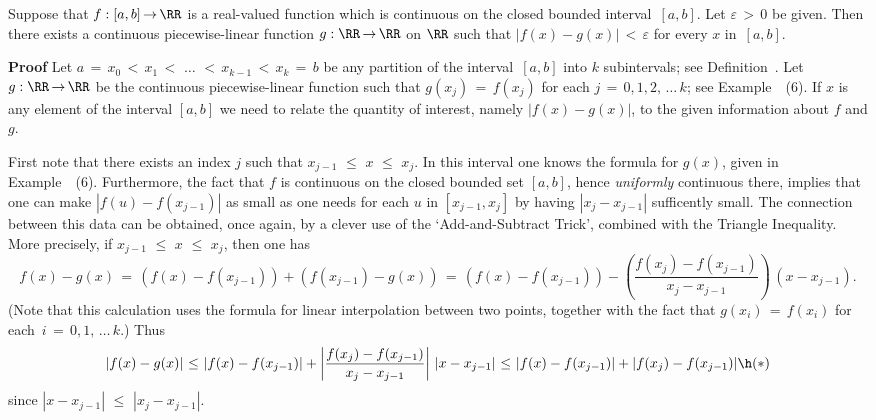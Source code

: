         Suppose that $f:[a,b] \,{\rightarrow}\, {\RR}$ is a real-valued function which is continuous on the closed bounded interval~$[a,b]$.
    Let ${\varepsilon}\,>\,0$ be given. Then there exists a continuous piecewise-linear function
    $g:{\RR} \,{\rightarrow}\, {\RR}$ on ${\RR}$ such that $|f(x)-g(x)|\,<\,{\varepsilon}$ for every $x$ in~$[a,b]$.

\V

        {\bf Proof} Let $a \,=\, x_{0}\,<\,x_{1}\,<\,\,{\ldots}\,\,<\,x_{k-1}\,<\,x_{k} \,=\, b$ be any partition of the interval~$[a,b]$ into $k$ subintervals; see Definition~.
    Let $g:{\RR} \,{\rightarrow}\, {\RR}$ be the continuous piecewise-linear function such that $g(x_{j}) \,=\, f(x_{j})$ for each $j \,=\, 0,1,2,\,{\ldots}\,k$; see Example~~(6).
    If $x$ is any element of the interval $[a,b]$ we need to relate the quantity of interest, namely $|f(x)-g(x)|$, to the given information about $f$ and $g$.

        First note that there exists an index $j$ such that $x_{j-1}\,\,{\leq}\,\,x\,\,{\leq}\,\,x_{j}$.
    In this interval one knows the formula for $g(x)$, given in Example~~(6).
    Furthermore, the fact that $f$ is continuous on the closed bounded set $[a,b]$, hence {\em uniformly} continuous there,
    implies that one can make $|f(u)-f(x_{j-1})|$ as small as one needs for each $u$ in $[x_{j-1},x_{j}]$ by having $|x_{j}-x_{j-1}|$ sufficently small.
    The connection between this data can be obtained, once again, by a clever use of the `Add-and-Subtract Trick', combined with the Triangle Inequality.
    More precisely, if $x_{j-1}\,\,{\leq}\,\,x\,\,{\leq}\,\,x_{j}$, then one has
        \begin{displaymath}
        f(x) - g(x) \,=\, (f(x) - f(x_{j-1})) + (f(x_{j-1}) - g(x))
     \,=\, 
        (f(x) - f(x_{j-1})) - \left(\frac{f(x_{j}) - f(x_{j-1})}{x_{j} - x_{j-1}}\right)\,(x - x_{j-1}).
        \end{displaymath}
    (Note that this calculation uses the formula for linear interpolation between two points,
    together with the fact that $g(x_{i}) \,=\, f(x_{i})$ for each~$i \,=\, 0,1,\,{\ldots}\,k$.)
   Thus
        \begin{displaymath}
        |f(x) - g(x)| \,\,{\leq}\,\,
        |f(x) - f(x_{j-1})| + \left|\frac{f(x_{j}) - f(x_{j-1})}{x_{j} - x_{j-1}}\right|\,|x - x_{j-1}|\,\,{\leq}\,\,|f(x) - f(x_{j-1})| + |f(x_{j})-f(x_{j-1})| \h ({\ast})
        \end{displaymath}
    since $|x-x_{j-1}|\,\,{\leq}\,\,|x_{j}-x_{j-1}|$.

